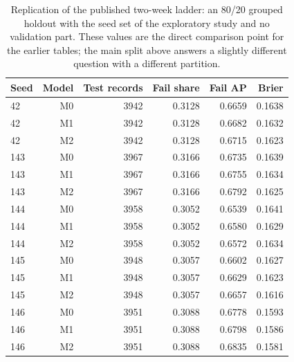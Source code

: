 \documentclass[11pt]{article}
\begin{document}
\begin{table}[t]
\centering
\scriptsize
\begin{tabular}{lrrrrr}
\toprule
Seed & Model & Test records & Fail share & Fail AP & Brier \\
\midrule
42 & M0 & 3942 & 0.3128 & 0.6659 & 0.1638 \\
42 & M1 & 3942 & 0.3128 & 0.6682 & 0.1632 \\
42 & M2 & 3942 & 0.3128 & 0.6715 & 0.1623 \\
143 & M0 & 3967 & 0.3166 & 0.6735 & 0.1639 \\
143 & M1 & 3967 & 0.3166 & 0.6755 & 0.1634 \\
143 & M2 & 3967 & 0.3166 & 0.6792 & 0.1625 \\
144 & M0 & 3958 & 0.3052 & 0.6539 & 0.1641 \\
144 & M1 & 3958 & 0.3052 & 0.6580 & 0.1629 \\
144 & M2 & 3958 & 0.3052 & 0.6572 & 0.1634 \\
145 & M0 & 3948 & 0.3057 & 0.6602 & 0.1627 \\
145 & M1 & 3948 & 0.3057 & 0.6629 & 0.1623 \\
145 & M2 & 3948 & 0.3057 & 0.6657 & 0.1616 \\
146 & M0 & 3951 & 0.3088 & 0.6778 & 0.1593 \\
146 & M1 & 3951 & 0.3088 & 0.6798 & 0.1586 \\
146 & M2 & 3951 & 0.3088 & 0.6835 & 0.1581 \\
\bottomrule
\end{tabular}
\caption{Replication of the published two-week ladder: an 80/20 grouped holdout with the seed set of the exploratory study and no validation part. These values are the direct comparison point for the earlier tables; the main split above answers a slightly different question with a different partition.}
\label{tab:parity}
\end{table}
\end{document}
